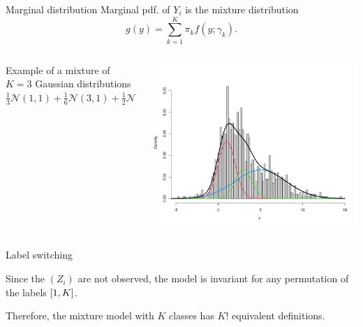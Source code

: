 \documentclass[compress,10pt]{beamer}
\begin{document}
\begin{frame}{Marginal distribution}
 Marginal pdf.  of $Y_i$ is the mixture distribution
$$
g(y) = \sum_{k=1}^K \pi_k f(y; \gamma_k).
$$

 



\begin{columns}
\begin{column}{0.5\textwidth}
 Example of a mixture of $K=3$ Gaussian distributions
$\frac{1}{3}\mathcal{N}(1,1) + \frac{1}{6}\mathcal{N}(3,1) + \frac{1}{2}\mathcal{N}(5,3^2)$
\end{column}
\begin{column}{0.5\textwidth}
    \begin{center}
   \includegraphics[width=\textwidth]{gaussian_mixtures}   
     \end{center}
\end{column}
\end{columns}
\end{frame}

\begin{frame}{Label switching}


Since the $(Z_i)$ are not observed, the model is invariant for any permutation of the labels $\interval{1}{K}$. 

Therefore, the mixture model with $K$ classes has $K!$ equivalent definitions.
\end{frame}
\end{document}
